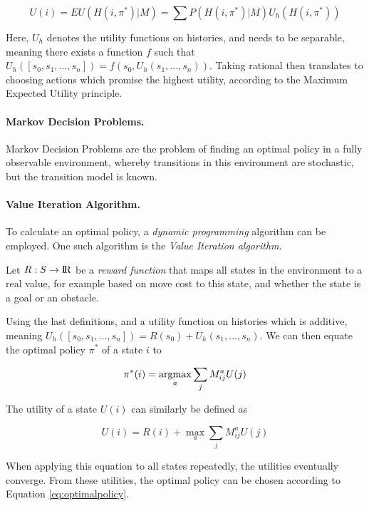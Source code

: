 \begin{equation}
	U(i) = EU(H(i, \pi^*)|M) = \sum P(H(i, \pi^*)|M)U_h(H(i,\pi^*))
\end{equation}

Here, $U_h$ denotes the utility functions on histories, and needs to be separable, meaning there exists a function $f$ such that $U_h([s_0, s_1,...,s_n]) = f(s_0, U_h(s_1, ..., s_n))$.
Taking rational then translates to choosing actions which promise the highest utility, according to the Maximum Expected Utility principle.

\paragraph{Markov Decision Problems.}

Markov Decision Problems are the problem of finding an optimal policy in a fully observable environment, whereby transitions in this environment are stochastic, but the transition model is known.


\paragraph{Value Iteration Algorithm.}\label{para:value_it}

To calculate an optimal policy, a \textit{dynamic programming} algorithm can be employed. One such algorithm is the \textit{Value Iteration algorithm}.

Let $R: S \rightarrow {\rm I\!R}$ be a \textit{reward function} that maps all states in the environment to a real value, for example based on move cost to this state, and whether the state is a goal or an obstacle.

Using the last definitions, and a utility function on histories which is additive, meaning $U_h([s_0, s_1,...,s_n]) = R(s_0) + U_h(s_1, ..., s_n)$. We can then equate the optimal policy $\pi^*$ of a state $i$ to 

\begin{equation}\label{eq:optimalpolicy}
	\pi^*(i) = \operatorname*{argmax}_a \sum_{j} M_{ij}^aU(j)
\end{equation}
	

The utility of a state $U(i)$ can similarly be defined as 

\begin{equation}
U(i)  = R(i) + \max_a \sum_j   M_{ij}^aU(j)
\end{equation}

When applying this equation to all states repeatedly, the utilities eventually converge. From these utilities, the optimal policy can be chosen according to Equation \ref{eq:optimalpolicy}.